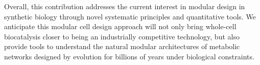     Overall, this contribution addresses the current interest in modular design in synthetic biology through novel systematic principles and quantitative tools.
    We anticipate this modular cell design approach will not only bring whole-cell biocatalysis closer to being an industrially competitive technology, but also provide tools to understand the natural modular architectures of metabolic networks designed by evolution for billions of years under biological constraints. %
